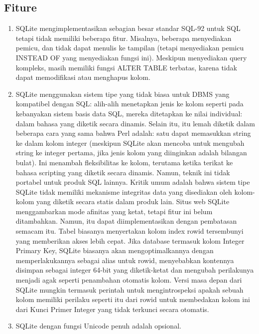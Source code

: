 \begin{enumerate}
	\subsection{Fiture}
		\begin{enumerate}
			\item SQLite mengimplementasikan sebagian besar standar SQL-92 untuk SQL tetapi tidak memiliki beberapa fitur. Misalnya, beberapa menyediakan pemicu, dan tidak dapat menulis ke tampilan (tetapi menyediakan pemicu INSTEAD OF yang menyediakan fungsi ini). Meskipun menyediakan query kompleks, masih memiliki fungsi ALTER TABLE terbatas, karena tidak dapat memodifikasi atau menghapus kolom.
			\item SQLite menggunakan sistem tipe yang tidak biasa untuk DBMS yang kompatibel dengan SQL: alih-alih menetapkan jenis ke kolom seperti pada kebanyakan sistem basis data SQL, mereka ditetapkan ke nilai individual: dalam bahasa yang diketik secara dinamis. Selain itu, itu lemah diketik dalam beberapa cara yang sama bahwa Perl adalah: satu dapat memasukkan string ke dalam kolom integer (meskipun SQLite akan mencoba untuk mengubah string ke integer pertama, jika jenis kolom yang diinginkan adalah bilangan bulat). Ini menambah fleksibilitas ke kolom, terutama ketika terikat ke bahasa scripting yang diketik secara dinamis. Namun, teknik ini tidak portabel untuk produk SQL lainnya. Kritik umum adalah bahwa sistem tipe SQLite tidak memiliki mekanisme integritas data yang disediakan oleh kolom-kolom yang diketik secara statis dalam produk lain. Situs web SQLite menggambarkan mode afinitas yang ketat, tetapi fitur ini belum ditambahkan. Namun, itu dapat diimplementasikan dengan pembatasan semacam itu. Tabel biasanya menyertakan kolom index rowid tersembunyi yang memberikan akses lebih cepat. Jika database termasuk kolom Integer Primary Key, SQLite biasanya akan mengoptimalkannya dengan memperlakukannya sebagai alias untuk rowid, menyebabkan kontennya disimpan sebagai integer 64-bit yang diketik-ketat dan mengubah perilakunya menjadi agak seperti penambahan otomatis kolom. Versi masa depan dari SQLite mungkin termasuk perintah untuk mengintrospeksi apakah sebuah kolom memiliki perilaku seperti itu dari rowid untuk membedakan kolom ini dari Kunci Primer Integer yang tidak terkunci secara otomatis.
			\item SQLite dengan fungsi Unicode penuh adalah opsional.

\end{enumerate}
\end{enumerate}
